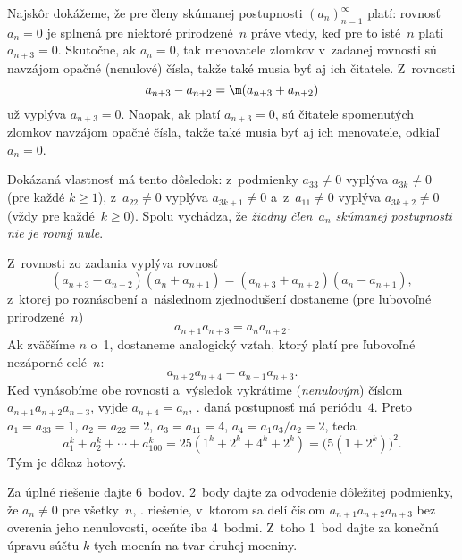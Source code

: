 {%
Najskôr dokážeme, že pre členy skúmanej postupnosti
$(a_n)_{n=1}^{\infty}$ platí: rovnosť $a_n=0$ je splnená pre
niektoré prirodzené~$n$ práve vtedy, keď pre to isté~$n$ platí
$a_{n+3}=0$. Skutočne, ak $a_n=0$, tak menovatele zlomkov
v~zadanej rovnosti sú navzájom opačné (nenulové) čísla, takže
také musia byť aj ich čitatele. Z~rovnosti
$$
a_{n+3}-a_{n+2}=\m(a_{n+3}+a_{n+2})
$$
už vyplýva $a_{n+3}=0$. Naopak, ak platí $a_{n+3}=0$, sú
čitatele spomenutých zlomkov navzájom opačné čísla, takže
také musia byť aj ich menovatele, odkiaľ $a_n=0$.

Dokázaná vlastnosť má tento dôsledok: z~podmienky $a_{33}\ne0$
vyplýva $a_{3k}\ne0$ (pre každé $k\ge1$), z~$a_{22}\ne0$ vyplýva $a_{3k+1}\ne0$ 
a~z~$a_{11}\ne0$ vyplýva $a_{3k+2}\ne0$ (vždy pre každé~$k\ge0$).
Spolu vychádza, že {\it žiadny člen~$a_n$ skúmanej postupnosti
nie je rovný nule}.

Z~rovnosti zo zadania vyplýva rovnosť
$$
(a_{n+3}-a_{n+2})(a_{n}+a_{n+1})=
(a_{n+3}+a_{n+2})(a_{n}-a_{n+1}),
$$
z~ktorej po roznásobení a~následnom zjednodušení dostaneme (pre ľubovoľné
prirodzené~$n$)
$$
a_{n+1}a_{n+3}=a_{n}a_{n+2}.
$$
Ak zväčšíme $n$ o~1, dostaneme analogický vzťah, ktorý platí pre
ľubovoľné nezáporné celé~$n$:
$$
a_{n+2}a_{n+4}=a_{n+1}a_{n+3}.
$$
Keď vynásobíme obe rovnosti
a~výsledok vykrátime ({\it nenulovým\/}) číslom $a_{n+1}a_{n+2}a_{n+3}$,
vyjde $a_{n+4}=a_{n}$, \tj. daná postupnosť má periódu~$4$.
Preto $a_1=a_{33}=1$, $a_2=a_{22}=2$, $a_3=a_{11}=4$,
$a_{4}=a_1a_3/a_2=2$, teda
$$
a_1^k+a_2^k+\cdots+a_{100}^k=25(1^k+2^k+4^k+2^k)=
\bigl(5(1+2^k)\bigr)^2.
$$
Tým je dôkaz hotový.


\nobreak\medskip\petit\noindent
Za úplné riešenie dajte 6~bodov.
2~body dajte za odvodenie dôležitej podmienky, že $a_n\ne0$ pre
všetky~$n$, \tj. riešenie, v~ktorom sa delí číslom
$a_{n+1}a_{n+2}a_{n+3}$ bez overenia jeho nenulovosti, oceňte
iba 4~bodmi. Z~toho 1~bod dajte za konečnú úpravu súčtu \hbox{$k$-tych}
mocnín na tvar druhej mocniny.
\endpetit
\bigbreak}

